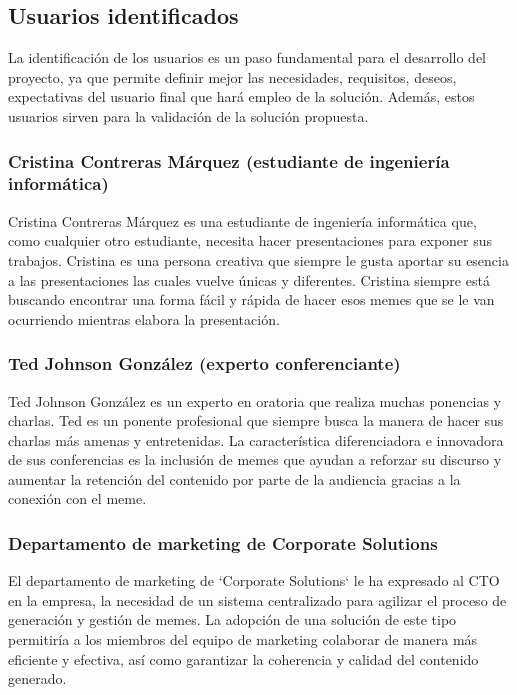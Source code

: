 \subsection{Usuarios identificados}\label{sec:usuarios_identificados}

    La identificación de los usuarios es un paso fundamental para el desarrollo del proyecto, ya que permite definir mejor las necesidades, requisitos, deseos, expectativas del usuario final que hará empleo de la solución. Además, estos usuarios sirven para la validación de la solución propuesta.

    \subsubsection{Cristina Contreras Márquez (estudiante de ingeniería informática)}

    Cristina Contreras Márquez es una estudiante de ingeniería informática que, como cualquier otro estudiante, necesita hacer presentaciones para exponer sus trabajos. Cristina es una persona creativa que siempre le gusta aportar su esencia a las presentaciones las cuales vuelve únicas y diferentes. Cristina siempre está buscando encontrar una forma fácil y rápida de hacer esos memes que se le van ocurriendo mientras elabora la presentación.

    \subsubsection{Ted Johnson González (experto conferenciante)}

    Ted Johnson González es un experto en oratoria que realiza muchas ponencias y charlas. Ted es un ponente profesional que siempre busca la manera de hacer sus charlas más amenas y entretenidas. La característica diferenciadora e innovadora de sus conferencias es la inclusión de memes que ayudan a reforzar su discurso y aumentar la retención del contenido por parte de la audiencia gracias a la conexión con el meme.

    \subsubsection{Departamento de marketing de Corporate Solutions}

    El departamento de marketing de `Corporate Solutions` le ha expresado al CTO en la empresa, la necesidad de un sistema centralizado para agilizar el proceso de generación y gestión de memes. La adopción de una solución de este tipo permitiría a los miembros del equipo de marketing colaborar de manera más eficiente y efectiva, así como garantizar la coherencia y calidad del contenido generado. 

